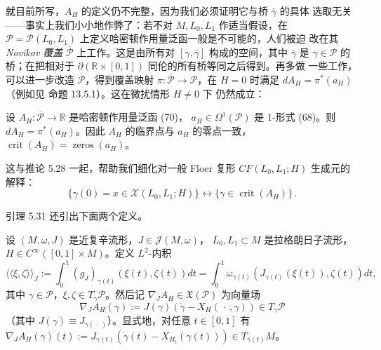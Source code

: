 就目前所写，$A_H$ 的定义仍不完整，因为我们必须证明它与桥 $\bar\gamma$ 的具体
选取无关——事实上我们小小地作弊了：若不对 $M,L_0,L_1$ 作适当假设，在
$\mathcal P=\mathcal P(L_0,L_1)$ 上定义哈密顿作用量泛函一般是不可能的，人们被迫
改在其 \emph{Novikov 覆盖} $\overline{\mathcal P}$ 上工作。这是由所有对
$[\gamma,\bar\gamma]$ 构成的空间，其中 $\bar\gamma$ 是 $\gamma\in\mathcal P$ 的
桥；在把相对于 $\partial(\mathbb R\times[0,1])$ 同伦的所有桥等同之后得到。再多做
一些工作，可以进一步改造 $\overline{\mathcal P}$，得到覆盖映射
$\pi:\overline{\mathcal P}\to\mathcal P$，在 $H=0$ 时满足
$dA_H=\pi^*(a_H)$（例如见 \cite{Oh91} 命题 13.5.1）。这在微扰情形 $H\neq0$ 下
仍然成立：

\begin{Lem}\label{lem:5.31}
设 $A_H:\overline{\mathcal P}\to\mathbb R$ 是哈密顿作用量泛函 (70)，
$a_H\in\Omega^1(\mathcal P)$ 是 $1$-形式 (68)。则
$dA_H=\pi^*(a_H)$。因此 $A_H$ 的临界点与 $a_H$ 的零点一致，
$\operatorname{crit}(A_H)=\operatorname{zeros}(a_H)$。
\end{Lem}


这与推论 5.28 一起，帮助我们细化对一般 Floer 复形
$CF(L_0,L_1;H)$ 生成元的解释：
\begin{equation}
\{\gamma(0)=x\in\mathcal X(L_0,L_1;H)\}\longleftrightarrow
\{\gamma\in\operatorname{crit}(A_H)\}\,.
\label{eq:5.71}
\end{equation}

引理 5.31 还引出下面两个定义。

\begin{Def}\label{def:5.32}
设 $(M,\omega,J)$ 是近复辛流形，$J\in\mathcal J(M,\omega)$，
$L_0,L_1\subset M$ 是拉格朗日子流形，$H\in C^\infty([0,1]\times M)$。定义
$L^2$-内积
\[
\langle\!\langle\xi,\zeta\rangle\!\rangle_J
:=\int_0^1(g_J)_{\gamma(t)}(\xi(t),\zeta(t))dt
=\int_0^1\omega_{\gamma(t)}(J_{\gamma(t)}(\xi(t)),\zeta(t))dt,
\]
其中 $\gamma\in\mathcal P$，$\xi,\zeta\in T_\gamma\mathcal P$。然后记
$\nabla_JA_H\in\mathfrak X(\mathcal P)$ 为向量场
\begin{equation}
\nabla_JA_H(\gamma):=J(\gamma)(\dot\gamma-X_H(\,\cdot\,,\gamma))\in
T_\gamma\mathcal P
\label{eq:5.72}
\end{equation}
（其中 $J(\gamma)\equiv J_{\gamma(\,\cdot\,)}$）。显式地，对任意 $t\in[0,1]$ 有
$\nabla_JA_H(\gamma)(t):=J_{\gamma(t)}(\dot\gamma(t)-X_{H_t}(\gamma(t)))
\in T_{\gamma(t)}M$。
\end{Def}


